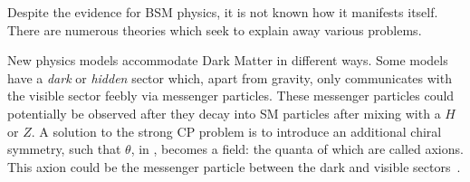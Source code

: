 
Despite the evidence for BSM physics, it is not known how it manifests itself.
There are numerous theories which seek to explain away various problems.

New physics models accommodate Dark Matter in different ways.
Some models have a \emph{dark} or \emph{hidden} sector which, apart from gravity, only
communicates with the visible sector feebly via messenger particles.
These messenger particles could potentially be observed after they decay into SM particles after
mixing with a $H$ or $Z$.
A solution to the strong CP problem is to introduce an additional chiral symmetry, such that
$\theta$, in , becomes a field: the quanta of which are called axions.
This axion could be the messenger particle between the dark and visible
sectors~\cite{Peccei:2006as}.


